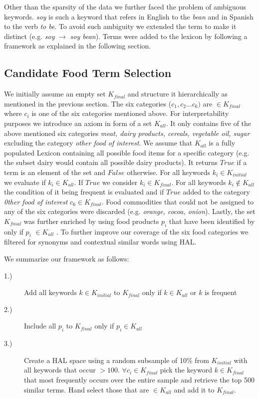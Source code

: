  Other than the sparsity of the data we further faced the problem of ambiguous keywords. \emph {soy} is such a keyword that refers in English to the \emph{bean} and in Spanish to the verb \emph{to be}. To avoid such ambiguity we extended the term to make it distinct (e.g. \emph{soy} $\to$  \emph{soy bean}). Terms were added to the lexicon by following a framework as explained in the following section. 



\subsection{Candidate Food Term Selection}

We initially assume an empty set $K_{final}$ and structure it hierarchically as mentioned in the previous section. The six categories ($c_1, c_2 ... c_6)$ are $\in K_{final}$ where $c_i$ is one of the six categories mentioned above. For interpretability purposes we introduce an axiom in form of a set $K_{all}$. It only contains five of the above mentioned six categories \emph{meat, dairy products, cereals, vegetable oil, sugar} excluding the category \emph{other food of interest}. We assume that $K_{all}$ is a fully populated Lexicon containing all possible food items for a specific category (e.g. the subset dairy would contain all possible dairy products). It returns $True$ if a term is an element of the set and $False$ otherwise. For all keywords $k_i \in K_{initial}$ we evaluate if $k_i\in K_{all}$. If $True$ we consider $k_i \in K_{final}$. For all keywords $k_i \notin K_{all}$ the condition of it being frequent is evaluated and if $True$ added to the category \emph{0ther food of interest}  $c_6 \in K_{final}$.  Food commodities that could not be assigned to any of the six categories were discarded (e.g. \emph {orange, cocoa, onion}). Lastly, the set $K_{final}$  was further enriched by using food products $p_i$ that have been identified by \cite{AbbarMW14}  only if $p_i$ $\in K_{all}$ . To further improve our coverage of the six food categories we filtered for synonyms and contextual similar words using HAL. 

We summarize our framework as follows: 

\begin{description}
  \item[1.)] Add all keywords $k \in K_{initial}$ to  $K_{final}$ only if $k \in K_{all} $ or $k$ is frequent 
  \item[2.)] Include all $p_i$ to $K_{final}$ only if $p_i \in K_{all}$
  \item[3.)] Create a HAL space using a random subsample of 10\% from $K_{initial}$ with all keywords that occur $> 100$. $\forall c_i \in K_{final} $  pick the keyword $k\in K_{final}$ that most frequently occurs over the entire sample and retrieve the top 500 similar terms. Hand select those that are $\in K_{all}$ and add it to $K_{final}$.
\end{description}
 
